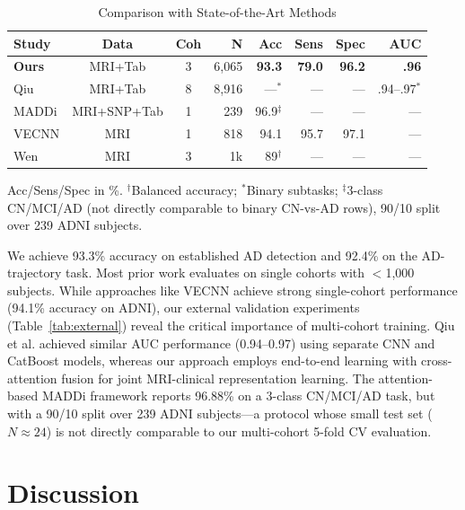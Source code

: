 \documentclass[conference]{IEEEtran}
\begin{document}
\begin{table}[htbp]
\caption{Comparison with State-of-the-Art Methods}
\begin{center}
\footnotesize
\setlength{\tabcolsep}{2.5pt}
\begin{tabular}{@{}lccrrrrr@{}}
\toprule
\textbf{Study} & \textbf{Data} & \textbf{Coh} & \textbf{N} & \textbf{Acc} & \textbf{Sens} & \textbf{Spec} & \textbf{AUC} \\
\midrule
\textbf{Ours} & MRI+Tab & 3 & 6,065 & \textbf{93.3} & \textbf{79.0} & \textbf{96.2} & \textbf{.96} \\
Qiu \cite{qiu2022} & MRI+Tab & 8 & 8,916 & ---$^*$ & --- & --- & .94--.97$^*$ \\
MADDi \cite{maddi2022} & MRI+SNP+Tab & 1 & 239 & 96.9$^\ddag$ & --- & --- & --- \\
VECNN \cite{vecnn2024} & MRI & 1 & 818 & 94.1 & 95.7 & 97.1 & --- \\
Wen \cite{wen2020} & MRI & 3 & 1k & 89$^\dag$ & --- & --- & --- \\
\bottomrule
\end{tabular}
\label{tab:comparison}
\end{center}
\vspace{-2mm}
{\scriptsize Acc/Sens/Spec in \%. $^\dag$Balanced accuracy; $^*$Binary subtasks; $^\ddag$3-class CN/MCI/AD (not directly comparable to binary CN-vs-AD rows), 90/10 split over 239 ADNI subjects.}
\end{table}

We achieve 93.3\% accuracy on established AD detection and 92.4\% on the AD-trajectory task. Most prior work evaluates on single cohorts with $<$1,000 subjects. While approaches like VECNN \cite{vecnn2024} achieve strong single-cohort performance (94.1\% accuracy on ADNI), our external validation experiments (Table~\ref{tab:external}) reveal the critical importance of multi-cohort training. Qiu et al. \cite{qiu2022} achieved similar AUC performance (0.94--0.97) using separate CNN and CatBoost models, whereas our approach employs end-to-end learning with cross-attention fusion for joint MRI-clinical representation learning. The attention-based MADDi framework \cite{maddi2022} reports 96.88\% on a 3-class CN/MCI/AD task, but with a 90/10 split over 239 ADNI subjects---a protocol whose small test set ($N\approx24$) is not directly comparable to our multi-cohort 5-fold CV evaluation.

\section{Discussion}
\end{document}
